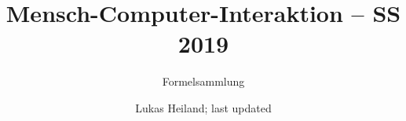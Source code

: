 \documentclass{scrartcl}
\begin{document}
	\title{Mensch-Computer-Interaktion -- SS 2019}
	\subtitle{Formelsammlung}
	\author{Lukas Heiland; last updated}
	
	\maketitle
	\pagebreak
	
	\tableofcontents
	\pagebreak
	
	
	
	\pagebreak
	
	
	
	\pagebreak
	
	
\end{document}
